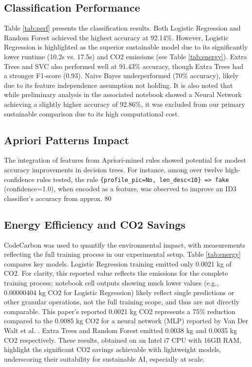 \documentclass[conference]{IEEEtran}
\begin{document}
\subsection{Classification Performance}
Table \ref{tab:perf} presents the classification results. Both Logistic Regression and Random Forest achieved the highest accuracy at 92.14\%. However, Logistic Regression is highlighted as the superior sustainable model due to its significantly lower runtime (10.2s vs. 17.5s) and CO2 emissions (see Table \ref{tab:energy}). Extra Trees and SVC also performed well at 91.43\% accuracy, though Extra Trees had a stronger F1-score (0.93). Naive Bayes underperformed (70\% accuracy), likely due to its feature independence assumption not holding. It is also noted that while preliminary analysis in the associated notebook showed a Neural Network achieving a slightly higher accuracy of 92.86\%, it was excluded from our primary sustainable comparison due to its high computational cost.

\subsection{Apriori Patterns Impact}
The integration of features from Apriori-mined rules showed potential for modest accuracy improvements in decision trees. For instance, among over twelve high-confidence rules tested, the rule \texttt{\{profile\_pic=No, len\_desc<10\} => fake} (confidence=1.0), when encoded as a feature, was observed to improve an ID3 classifier's accuracy from approx. 80%

\subsection{Energy Efficiency and CO2 Savings}
CodeCarbon \cite{b13} was used to quantify the environmental impact, with measurements reflecting the full training process in our experimental setup. Table \ref{tab:energy} compares key models. Logistic Regression training emitted only 0.0021 kg of CO2. For clarity, this reported value reflects the emissions for the complete training process; notebook cell outputs showing much lower values (e.g., 0.00000404 kg CO2 for Logistic Regression) likely reflect single predictions or other granular operations, not the full training scope, and thus are not directly comparable. This paper's reported 0.0021 kg CO2 represents a 75\% reduction compared to the 0.0085 kg CO2 for a neural network (MLP) reported by Van Der Walt et al. \cite{b6}. Extra Trees and Random Forest emitted 0.0038 kg and 0.0035 kg CO2 respectively. These results, obtained on an Intel i7 CPU with 16GB RAM, highlight the significant CO2 savings achievable with lightweight models, underscoring their suitability for sustainable AI, especially at scale.
\end{document}
